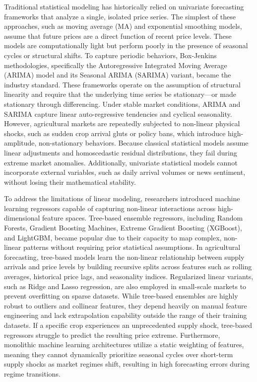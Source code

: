 \documentclass[12pt,a4paper]{report}
\theoremstyle{definition}
\theoremstyle{remark}
\begin{document}
Traditional statistical modeling has historically relied on univariate forecasting frameworks that analyze a single, isolated price series. The simplest of these approaches, such as moving average (MA) and exponential smoothing models, assume that future prices are a direct function of recent price levels. These models are computationally light but perform poorly in the presence of seasonal cycles or structural shifts. To capture periodic behaviors, Box-Jenkins methodologies, specifically the Autoregressive Integrated Moving Average (ARIMA) model and its Seasonal ARIMA (SARIMA) variant, became the industry standard. These frameworks operate on the assumption of structural linearity and require that the underlying time series be stationary—or made stationary through differencing. Under stable market conditions, ARIMA and SARIMA capture linear auto-regressive tendencies and cyclical seasonality. However, agricultural markets are repeatedly subjected to non-linear physical shocks, such as sudden crop arrival gluts or policy bans, which introduce high-amplitude, non-stationary behaviors. Because classical statistical models assume linear adjustments and homoscedastic residual distributions, they fail during extreme market anomalies. Additionally, univariate statistical models cannot incorporate external variables, such as daily arrival volumes or news sentiment, without losing their mathematical stability.

To address the limitations of linear modeling, researchers introduced machine learning regressors capable of capturing non-linear interactions across high-dimensional feature spaces. Tree-based ensemble regressors, including Random Forests, Gradient Boosting Machines, Extreme Gradient Boosting (XGBoost), and LightGBM, became popular due to their capacity to map complex, non-linear patterns without requiring prior statistical assumptions. In agricultural forecasting, tree-based models learn the non-linear relationship between supply arrivals and price levels by building recursive splits across features such as rolling averages, historical price lags, and seasonality indices. Regularized linear variants, such as Ridge and Lasso regression, are also employed in small-scale markets to prevent overfitting on sparse datasets. While tree-based ensembles are highly robust to outliers and collinear features, they depend heavily on manual feature engineering and lack extrapolation capability outside the range of their training datasets. If a specific crop experiences an unprecedented supply shock, tree-based regressors struggle to predict the resulting price extreme. Furthermore, monolithic machine learning architectures utilize a static weighting of features, meaning they cannot dynamically prioritize seasonal cycles over short-term supply shocks as market regimes shift, resulting in high forecasting errors during regime transitions.
\end{document}
